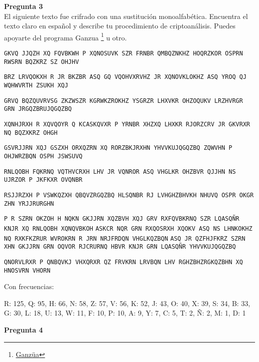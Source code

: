 \documentclass{article}
\newenvironment{problem}[2][Pregunta]
    { \begin{mdframed}[backgroundcolor=gray!20] \textbf{#1 #2} \\}
    {  \end{mdframed}}
\begin{document}
\begin{problem}{3}
  El siguiente texto fue crifrado con una sustitución monoalfabética. Encuentra el texto claro en
  español y describe tu procedimiento de criptoanálisis. Puedes apoyarte del programa Ganzua
  \footnote{\href{https://ganzua.sourceforge.net/en/index.html}{Ganzüa}} u otro.

  \small
  {\tt GKVQ JJQZH XQ FQVBKWH P XQNOSUVK SZR FRNBR QMBQZNKHZ HOQRZKOR OSPRN RWSRN BQZKRZ SZ OHJHV}
  
  {\tt BRZ LRVQOKXH R JR BKZBR ASQ GQ VQOHVXRVHZ JR XQNOVKLOKHZ ASQ YROQ QJ WQHWVRTH ZSUKH XQJ}
  
  {\tt GRVQ BQZQUVRVSG ZKZWSZR KGRWKZROKHZ YSGRZR LHXVKR OHZOQUKV LRZHVRGR GRN JRGQZBRUJQGQZBQ}
  
  {\tt XQNHJRXH R XQVQOYR Q KCASKQVXR P YRNBR XHZXQ LHXKR RJORZCRV JR GKVRXR NQ BQZXKRZ OHGH}
  
  {\tt GSVRJJRN XQJ GSZXH ORXQZRN XQ RORZBKJRXHN YHVVKUJQGQZBQ ZQWVHN P OHJWRZBQN OSPH JSWSUVQ}
  
  {\tt RNLQOBH FQKRNQ VQTHVCRXH LHV JR VQNROR ASQ VHGLKR OHZBVR QJJHN NS UJRZOR P JKFKXR OVQNBR}
  
  {\tt RSJJRZXH P VSWKQZXH QBQVZRGQZBQ HLSQNBR RJ LVHGHZBHVKH NHUVQ OSPR OKGR ZHN YRJJRURGHN}

  {\tt P R SZRN OKZOH H NQKN GKJJRN XQZBVH XQJ GRV RXFQVBKRNQ SZR LQASQÑR KNJR XQ RNLQOBH XQNQVBKOH}
  {\tt ASKCR NQR GRN RXQOSRXH XQOKV ASQ NS LHNKOKHZ NQ RXKFKZRUR WVROKRN R JRN NRJFRDQN VHGLKQZBQN}
  {\tt ASQ JR QZFHJFKRZ SZRN XHN GKJJRN GRN OQVOR RJCRURNQ HBVR KNJR GRN LQASQÑR YHVVKUJQGQZBQ}

  {\tt QNORVLRXR P QNBQVKJ VHXQRXR QZ FRVKRN LRVBQN LHV RGHZBHZRGKQZBHN XQ HNOSVRN VHORN}

  \normalsize

  Con frecuencias:

  \ttfamily
  R: 125, Q: 95, H: 66, N: 58, Z: 57, V: 56, K: 52, J: 43, O: 40, X: 39, S: 34, B: 33,
  G: 30, L: 18, U: 13, W: 11, F: 10, P: 10, A: 9, Y: 7, C: 5, T: 2, Ñ: 2, M: 1, D: 1

  \normalfamily
\end{problem}
\begin{problem}{4}
  
\end{problem}
\end{document}
